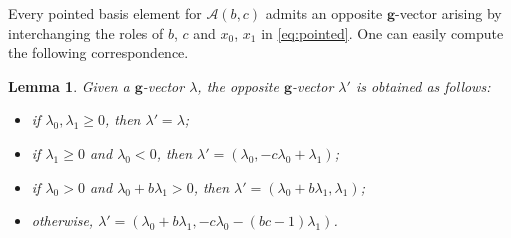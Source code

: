 \documentclass{amsart}
\newtheorem{lemma}[theorem]{Lemma}
\numberwithin{theorem}{section}
\newcommand{\bfg}{\boldsymbol{g}}
\newcommand{\cA}{\mathcal{A}}
\begin{document}
  Every pointed basis element for $\cA(b,c)$ admits an opposite $\bfg$-vector arising by interchanging the roles of $b$, $c$ and $x_0$, $x_1$ in \eqref{eq:pointed}. 
  One can easily compute the following correspondence.
  \begin{lemma}
    Given a $\bfg$-vector $\lambda$, the opposite $\bfg$-vector $\lambda'$ is obtained as follows:
    \begin{itemize}
      \item if $\lambda_0,\lambda_1\ge0$, then $\lambda'=\lambda$;
      \item if $\lambda_1\ge0$ and $\lambda_0<0$, then $\lambda'=(\lambda_0,-c\lambda_0+\lambda_1)$;
      \item if $\lambda_0>0$ and $\lambda_0+b\lambda_1>0$, then $\lambda'=(\lambda_0+b\lambda_1,\lambda_1)$;
      \item otherwise, $\lambda'=(\lambda_0+b\lambda_1,-c\lambda_0-(bc-1)\lambda_1)$.
    \end{itemize}
  \end{lemma}
\end{document}
